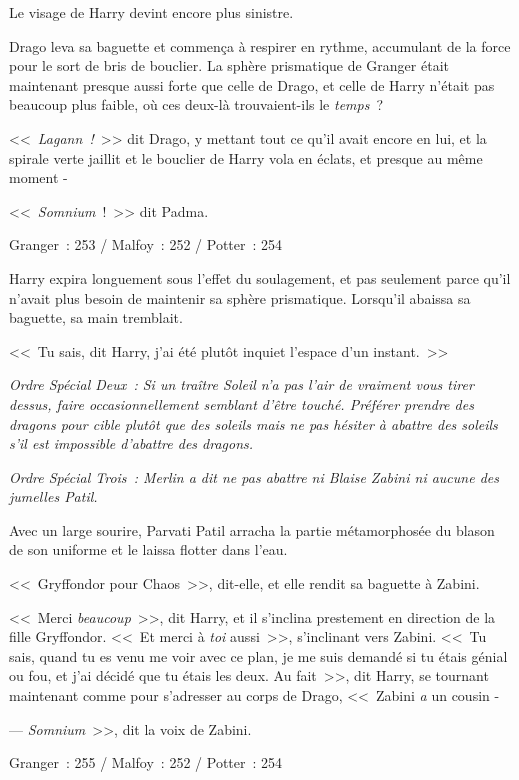 Le visage de Harry devint encore plus sinistre.

Drago leva sa baguette et commença à respirer en rythme, accumulant de la force pour le sort de bris de bouclier. La sphère prismatique de Granger était maintenant presque aussi forte que celle de Drago, et celle de Harry n'était pas beaucoup plus faible, où ces deux-là trouvaient-ils le \emph{temps}~?

<<~\emph{Lagann~!}~>> dit Drago, y mettant tout ce qu'il avait encore en lui, et la spirale verte jaillit et le bouclier de Harry vola en éclats, et presque au même moment -

<<~\emph{Somnium}~!~>> dit Padma.

\later

Granger~: 253 / Malfoy~: 252 / Potter~: 254

Harry expira longuement sous l'effet du soulagement, et pas seulement parce qu'il n'avait plus besoin de maintenir sa sphère prismatique. Lorsqu'il abaissa sa baguette, sa main tremblait.

<<~Tu sais, dit Harry, j'ai été plutôt inquiet l'espace d'un instant.~>>

\emph{Ordre Spécial Deux~: Si un traître Soleil n'a pas l'air de vraiment vous tirer dessus, faire occasionnellement semblant d'être touché. Préférer prendre des dragons pour cible plutôt que des soleils mais ne pas hésiter à abattre des soleils s'il est impossible d'abattre des dragons.}

\emph{Ordre Spécial Trois~: Merlin a dit ne pas abattre ni Blaise Zabini ni aucune des jumelles Patil.}

Avec un large sourire, Parvati Patil arracha la partie métamorphosée du blason de son uniforme et le laissa flotter dans l'eau.

<<~Gryffondor pour Chaos~>>, dit-elle, et elle rendit sa baguette à Zabini.

<<~Merci \emph{beaucoup}~>>, dit Harry, et il s'inclina prestement en direction de la fille Gryffondor. <<~Et merci à \emph{toi} aussi~>>, s'inclinant vers Zabini. <<~Tu sais, quand tu es venu me voir avec ce plan, je me suis demandé si tu étais génial ou fou, et j'ai décidé que tu étais les deux. Au fait~>>, dit Harry, se tournant maintenant comme pour s'adresser au corps de Drago, <<~Zabini \emph{a} un cousin -

--- \emph{Somnium}~>>, dit la voix de Zabini.

\later

Granger~: 255 / Malfoy~: 252 / Potter~: 254

